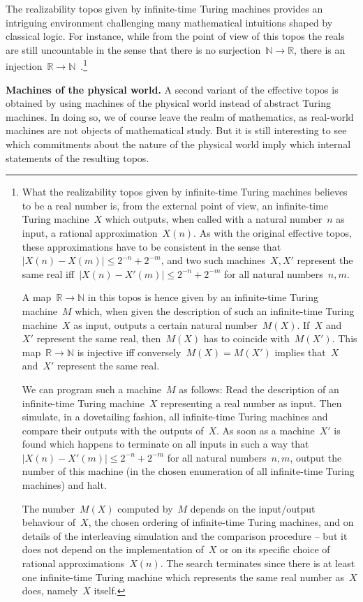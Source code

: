 \documentclass[graybox]{svmult}
\newcommand{\NN}{\mathbb{N}}
\newcommand{\RR}{\mathbb{R}}
\renewcommand{\_}{\mathpunct{.}\,}
\newcommand{\effective}{ef{}fective\xspace}
\newcommand{\?}{\,{:}\,}
\renewcommand{\paragraph}[1]{\noindent\textbf{#1.}}
\begin{document}
The realizability topos given by infinite-time Turing machines provides an intriguing environment challenging many
mathematical intuitions shaped by classical logic. For instance, while from the
point of view of this topos the reals are still uncountable in the sense that
there is no surjection~$\NN \to \RR$, there is an injection~$\RR \to
\NN$~\cite[Section~4]{bauer:injection}.\footnote{What the realizability topos
given by infinite-time Turing machines believes to be a real number is, from
the external point of view, an infinite-time Turing machine~$X$ which outputs,
when called with a natural number~$n$ as input, a rational
approximation~$X(n)$. As with the original \effective topos, these
approximations have to be consistent in the sense that~$|X(n) - X(m)| \leq
2^{-n} + 2^{-m}$, and two such machines~$X, X'$ represent the same real
iff~$|X(n) - X'(m)| \leq 2^{-n} + 2^{-m}$ for all natural numbers~$n,m$.

A map~$\RR \to \NN$ in this topos is hence given by an infinite-time
Turing machine~$M$ which, when given the description of such an infinite-time
Turing machine~$X$ as input, outputs a certain natural number~$M(X)$. If~$X$
and~$X'$ represent the same real, then~$M(X)$ has to coincide with~$M(X')$.
This map~$\RR \to \NN$ is injective iff conversely~$M(X) = M(X')$ implies
that~$X$ and~$X'$ represent the same real.

We can program such a machine~$M$ as follows: Read the description of an
infinite-time Turing machine~$X$ representing a real number as input. Then
simulate, in a dovetailing fashion, all infinite-time Turing machines and
compare their outputs with the outputs of~$X$. As soon as a machine~$X'$ is
found which happens to terminate on all inputs in such a way that~$|X(n) -
X'(m)| \leq 2^{-n} + 2^{-m}$ for all natural numbers~$n,m$, output the number
of this machine (in the chosen enumeration of all infinite-time Turing
machines) and halt.

The number~$M(X)$ computed by~$M$ depends on the input/output behaviour of~$X$,
the chosen ordering of infinite-time Turing machines, and on details of the
interleaving simulation and the comparison procedure -- but it does not depend on
the implementation of~$X$ or on its specific choice of rational
approximations~$X(n)$. The search terminates since there is at least one
infinite-time Turing machine which represents the same real number as~$X$ does,
namely~$X$ itself.}


\bigskip
\paragraph{Machines of the physical world} A second variant of the
\effective topos is obtained by using machines of the physical world
instead of abstract Turing machines. In doing so, we of
course leave the realm of mathematics, as real-world machines are not objects
of mathematical study. But it is still interesting to see which commitments
about the nature of the physical world imply which internal statements of the
resulting topos.
\end{document}
